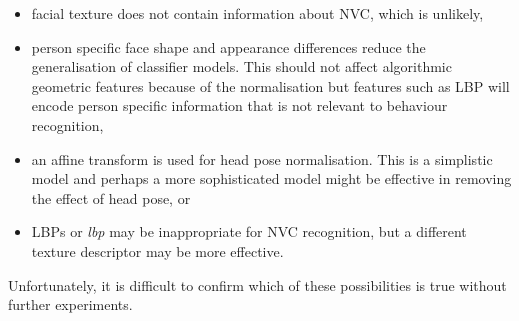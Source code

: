 \begin{itemize}
 \item facial texture does not contain information about \ac{NVC}, which is unlikely, %
 \item person specific face shape and appearance differences reduce the generalisation of classifier models. This should not affect algorithmic geometric features because of the normalisation but features such as \ac{LBP} will encode person specific information that is not relevant to behaviour recognition,
 \item an affine transform is used for head pose normalisation. This is a simplistic model and perhaps a more sophisticated model might be effective in removing the effect of head pose, or
 \item \ac{LBP}s or \textit{lbp} may be inappropriate for \ac{NVC} recognition, but a different texture descriptor may be more effective.
\end{itemize}

Unfortunately, it is difficult to confirm which of these possibilities is true without further experiments. %


